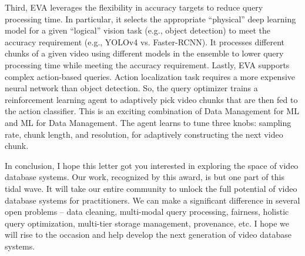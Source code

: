 \documentclass[11pt]{article}
\begin{document}
Third, EVA leverages the flexibility in accuracy targets to reduce query processing time. In particular, it selects the appropriate “physical” deep learning model for a given “logical” vision task (e.g., object detection) to meet the accuracy requirement (e.g., YOLOv4 vs. Faster-RCNN). It processes different chunks of a given video using different models in the ensemble to lower query processing time while meeting the accuracy requirement. Lastly, EVA supports complex action-based queries. Action localization task requires a more expensive neural network than object detection. So, the query optimizer trains a reinforcement learning agent to adaptively pick video chunks that are then fed to the action classifier. This is an exciting combination of Data Management for ML and ML for Data Management. The agent learns to tune three knobs: sampling rate, chunk length, and resolution, for adaptively constructing the next video chunk.

In conclusion, I hope this letter got you interested in exploring the space of video database systems. Our work, recognized by this award, is but one part of this tidal wave. It will take our entire community to unlock the full potential of video database systems for practitioners. We can make a significant difference in several open problems -- data cleaning, multi-modal query processing, fairness, holistic query optimization, multi-tier storage management, provenance, etc. I hope we will rise to the occasion and help develop the next generation of video database systems.
\end{document}
